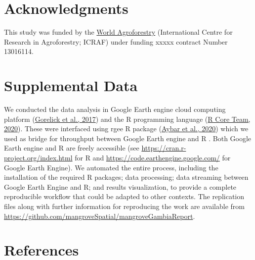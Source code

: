 \documentclass[utf8]{frontiersSCNS}
\begin{document}
\hypertarget{acknowledgments}{%
\section*{Acknowledgments}\label{acknowledgments}}

This study was funded by the
\href{http://www.worldagroforestry.org/}{World Agroforestry}
(International Centre for Research in Agroforestry; ICRAF) under funding
xxxxx contract Number 13016114.

\hypertarget{supplemental-data}{%
\section{Supplemental Data}\label{supplemental-data}}

We conducted the data analysis in Google Earth engine cloud computing
platform (\protect\hyperlink{ref-Gorelick-et-al-2017}{Gorelick et al.,
2017}) and the R programming language
(\protect\hyperlink{ref-R-Core-Team-2020}{R Core Team, 2020}). These
were interfaced using rgee R package
(\protect\hyperlink{ref-Aybar-et-al-2020}{Aybar et al., 2020}) which we
used as bridge for throughput between Google Earth engine and R . Both
Google Earth engine and R are freely accessible (see
\url{https://cran.r-project.org/index.html} for R and
\url{https://code.earthengine.google.com/} for Google Earth Engine). We
automated the entire process, including the installation of the required
R packages; data processing; data streaming between Google Earth Engine
and R; and results visualization, to provide a complete reproducible
workflow that could be adapted to other contexts. The replication files
along with further information for reproducing the work are available
from \url{https://github.com/mangroveSpatial/mangroveGambiaReport}.

\hypertarget{references}{%
\section*{References}\label{references}}
\end{document}
